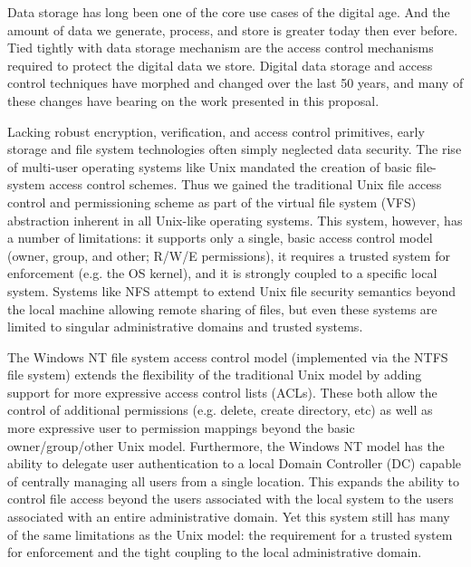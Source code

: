 Data storage has long been one of the core use cases of the digital
age. And the amount of data we generate, process, and store is greater
today then ever before. Tied tightly with data storage mechanism are
the access control mechanisms required to protect the digital data we
store. Digital data storage and access control techniques have morphed
and changed over the last 50 years, and many of these changes have
bearing on the work presented in this proposal.

Lacking robust encryption, verification, and access control
primitives, early storage and file system technologies often simply
neglected data security. The rise of multi-user operating systems like
Unix mandated the creation of basic file-system access control
schemes. Thus we gained the traditional Unix file access control and
permissioning scheme as part of the virtual file system
(VFS)~\cite{linux-vfs} abstraction inherent in all Unix-like operating
systems. This system, however, has a number of limitations: it
supports only a single, basic access control model (owner, group, and
other; R/W/E permissions), it requires a trusted system for
enforcement (e.g. the OS kernel), and it is strongly coupled to a
specific local system. Systems like NFS attempt to extend Unix file
security semantics beyond the local machine allowing remote sharing of
files, but even these systems are limited to singular administrative
domains and trusted systems.

The Windows NT file system access control model (implemented via the
NTFS file system) extends the flexibility of the traditional Unix
model by adding support for more expressive access control lists
(ACLs). These both allow the control of additional permissions
(e.g. delete, create directory, etc) as well as more expressive user
to permission mappings beyond the basic owner/group/other Unix
model. Furthermore, the Windows NT model has the ability to delegate
user authentication to a local Domain Controller (DC) capable of
centrally managing all users from a single location. This expands the
ability to control file access beyond the users associated with the
local system to the users associated with an entire administrative
domain. Yet this system still has many of the same limitations as the
Unix model: the requirement for a trusted system for enforcement and
the tight coupling to the local administrative domain.

